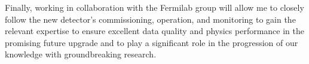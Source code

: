 {\begin{flushleft}
\vspace{\baselineskip}
Finally, working in collaboration with the Fermilab group will allow me to closely follow the new detector's commissioning, operation, and monitoring to gain the relevant expertise to ensure excellent data quality and physics performance in the promising future upgrade and to play a significant role in the progression of our knowledge with groundbreaking research.
\vspace{\baselineskip}


\end{flushleft}
}
